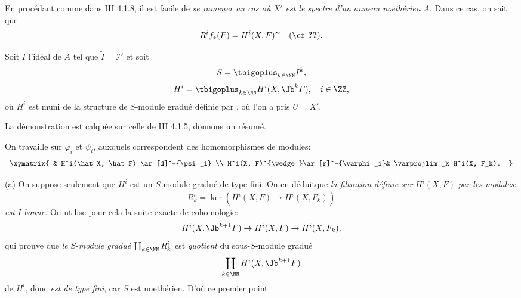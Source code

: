 En proc\'edant comme dans \EGA III 4.1.8, il est facile de \emph{se ramener au cas o\`u} $X'$ \emph{est le spectre d'un anneau noeth\'erien} $A$. Dans ce cas, on sait que
\begin{equation} \label{eq:IX.1.13} R^if_*(F)=H^i(X, F)^\thicksim \quad \text{(\cf \Ref{eq:IX.1.10}).}
\end{equation}

Soit $I$ l'id\'eal de $A$ tel que $\tilde{I}=\mathcal I'$ et soit
\begin{equation} \label{eq:IX.1.14}
S=\tbigoplus_{k \in \NN}I^k,
\end{equation}
\begin{equation} \label{eq:IX.1.15}
H^i=\tbigoplus_{k \in \NN}H^i(X, {\Jb}^k F), \quad i \in \ZZ,
\end{equation}
o\`u $H^i$ est muni de la structure de $S$-module gradu\'e d\'efinie par , o\`u l'on a pris $U=X'$.

La d\'emonstration est calqu\'ee sur celle de \EGA III 4.1.5, donnons un r\'esum\'e.

On travaille sur $\varphi_i$ et $\psi_i$, auxquels correspondent des homomorphismes de modules:
\begin{equation} \label{eq:IX.1.16}
\begin{array}{c}
\xymatrix{ & H^i(\hat X, \hat F) \ar[d]^-{\psi_i} \\
H^i(X, F)^{\wedge}\ar[r]^-{\varphi_i}& \varprojlim_k H^i(X, F_k).
}
\end{array}
\end{equation}

\indent\textup{(a)} On suppose seulement que $H^i$ est un $S$-module gradu\'e de type fini. On en d\'eduit\pageoriginale que \emph{la filtration d\'efinie sur} $H^i(X, F)$ \emph{par les modules}:
\begin{equation} \label{eq:IX.1.17} R^i_k=\ker(H^i(X, F)\to H^i(X, F_k))
\end{equation}
\emph{est} $I$-\emph{bonne}. On utilise pour cela la suite exacte de cohomologie:
\begin{equation} \label{eq:IX.1.18} H^i(X, {\Jb}^{k+1}F)\to H^i(X, F)\to H^i(X, F_k),
\end{equation}
qui prouve que \emph{le} $S$-\emph{module gradu\'e} $\coprod_{k \in \NN} R_k^i$ est \emph {quotient} du sous-$S$-module gradu\'e
\begin{equation*}
\coprod_{k \in \NN}H^i(X, {\Jb}^{k+1}F)
\end{equation*}
de $H^i$, donc \emph{est de type fini}, car $S$ est noeth\'erien. D'o\`u ce premier point.

